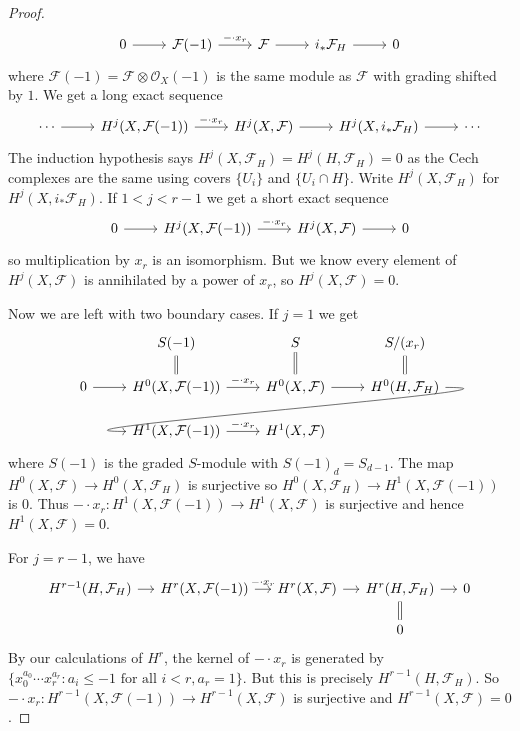 \documentclass[a4paper]{article}
\newcommand{\sh}[1]{\mathcal{#1}} %
\begin{document}
\begin{proof}
  \[
    \begin{tikzcd}
      0 \ar[r] & \sh F(-1) \ar[r, "-\cdot x_r"] & \sh F \ar[r] & i_* \sh F_H \ar[r] & 0
    \end{tikzcd}
  \]
  where \(\sh F(-1) = \sh F \otimes \sh O_X(-1)\) is the same module as \(\sh F\) with grading shifted by \(1\). We get a long exact sequence
  \[
    \begin{tikzcd}
      \cdots \ar[r] & H^j(X, \sh F(-1)) \ar[r, "- \cdot x_r"] & H^j(X, \sh F) \ar[r] & H^j(X, i_* \sh F_H) \ar[r] & \cdots
    \end{tikzcd}
  \]
  The induction hypothesis says \(H^j(X, \sh F_H) = H^j(H, \sh F_H) = 0\) as the Cech complexes are the same using covers \(\{U_i\}\) and \(\{U_i \cap H\}\). Write \(H^j(X, \sh F_H)\) for \(H^j(X, i_* \sh F_H)\). If \(1 < j < r - 1\) we get a short exact sequence
  \[
    \begin{tikzcd}
      0 \ar[r] & H^j(X, \sh F(-1)) \ar[r, "- \cdot x_r"] & H^j(X, \sh F) \ar[r] & 0
    \end{tikzcd}
  \]
  so multiplication by \(x_r\) is an isomorphism. But we know every element of \(H^j(X, \sh F)\) is annihilated by a power of \(x_r\), so \(H^j(X, \sh F) = 0\).

  Now we are left with two boundary cases. If \(j = 1\) we get
  \[
    \begin{tikzcd}[row sep=scriptsize]
      & S(-1) \ar[d, equal] & S \ar[d, equal] & S/(x_r) \ar[d, equal] \\
      0 \ar[r] & H^0(X, \sh F(-1)) \ar[r, "- \cdot x_r"] & H^0(X, \sh F) \ar[r] & H^0(H, \sh F_H) \ar[dll, overlay, in=180, out=0] \\
      & H^1(X, \sh F(-1)) \ar[r, "- \cdot x_r"] & H^1(X, \sh F)
    \end{tikzcd}
  \]
  where \(S(-1)\) is the graded \(S\)-module with \(S(-1)_d = S_{d - 1}\). The map \(H^0(X, \sh F) \to H^0(X, \sh F_H)\) is surjective so \(H^0(X, \sh F_H) \to H^1(X, \sh F(-1))\) is \(0\). Thus \(- \cdot x_r: H^1(X, \sh F(-1)) \to H^1(X, \sh F)\) is surjective and hence \(H^1(X, \sh F) = 0\).

  For \(j = r - 1\), we have
  \[
    \begin{tikzcd}[row sep=scriptsize, column sep=small]
      H^{r - 1}(H, \sh F_H) \ar[r] & H^r(X, \sh F(-1)) \ar[r, "- \cdot x_r"] & H^r(X, \sh F) \ar[r] & H^r(H, \sh F_H) \ar[d, equal] \ar[r] & 0 \\
      & & & 0
    \end{tikzcd}
  \]
  By our calculations of \(H^r\), the kernel of \(- \cdot x_r\) is generated by \(\{x_0^{a_0} \cdots x_r^{a_r}: a_i \leq -1 \text{ for all } i < r, a_r = 1\}\). But this is precisely \(H^{r - 1}(H, \sh F_H)\). So \(- \cdot x_r: H^{r - 1}(X, \sh F(-1)) \to H^{r - 1}(X, \sh F)\) is surjective and \(H^{r - 1}(X, \sh F) = 0\).
\end{proof}
\end{document}
